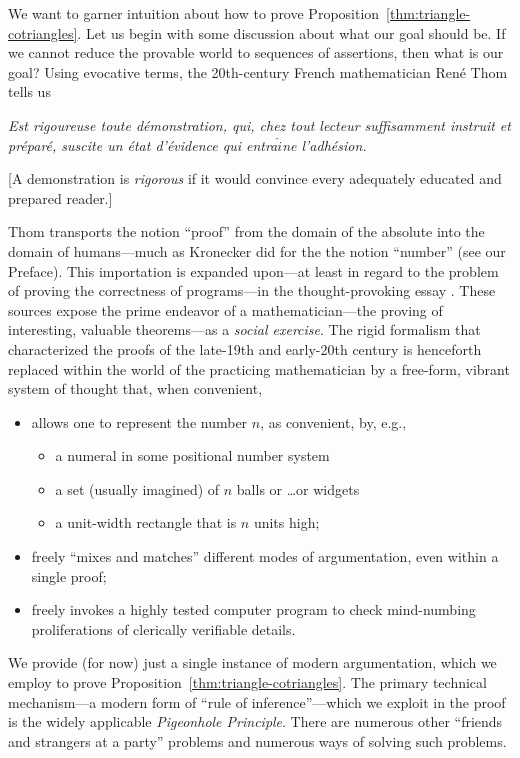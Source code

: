 We want to garner intuition about how to prove Proposition~\ref{thm:triangle-cotriangles}.  Let us begin with some discussion about what our goal should be.  If we cannot reduce the provable world to sequences of assertions, then what is our goal?  Using evocative terms, the 20th-century French mathematician Ren\'{e} Thom tells us

\bigskip

\begin{minipage}{0.96\textwidth}
{\em Est rigoureuse toute d\'{e}monstration, qui, chez tout lecteur suffisamment instruit et pr\'{e}par\'{e}, suscite un \'{e}tat d'\'{e}vidence qui entra$\hat{i}$ne l'adh\'{e}sion.}

\smallskip

[A demonstration is {\em rigorous} if it would convince every adequately educated and prepared reader.]
\end{minipage}

\bigskip

\noindent
Thom transports the notion ``proof'' from the domain of the absolute into the domain of humans---much as Kronecker did for the the notion ``number'' (see our Preface).  This importation is expanded upon---at least in regard to the problem of proving the correctness of
programs---in the thought-provoking essay \cite{DeMilloLP79}.  These sources expose the prime endeavor of a mathematician---the proving of interesting, valuable theorems---as a {\em social exercise}.  The rigid formalism that characterized the proofs of the late-19th and early-20th century is henceforth replaced within the world of the practicing mathematician by a free-form, vibrant system of thought that, when convenient,
\begin{itemize}
\item
allows one to represent the number $n$, as convenient, by, e.g.,
  \begin{itemize}
  \item
a numeral in some positional number system
  \medskip\item
a set (usually imagined) of $n$ balls or \ldots or widgets
  \medskip\item
a unit-width rectangle that is $n$ units high;
  \end{itemize}

\medskip\item
freely ``mixes and matches'' different modes of argumentation, even within a single proof;

\medskip\item
freely invokes a highly tested computer program to check mind-numbing proliferations of clerically verifiable details.
\end{itemize}
We provide (for now) just a single instance of modern argumentation, which we employ to prove Proposition~\ref{thm:triangle-cotriangles}.  The primary technical mechanism---a modern form of ``rule of inference''---which we exploit in the proof is the widely applicable {\it Pigeonhole Principle}.  There are numerous other ``friends and strangers at a party'' problems and numerous ways of solving such problems.

